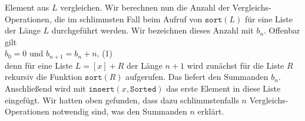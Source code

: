 Element aus $L$ vergleichen.  Wir berechnen nun die Anzahl der
Vergleichs-Operationen, die im schlimmsten Fall beim Aufruf von $\texttt{sort}(L)$ f\"ur
eine Liste der L\"ange $L$ durchgef\"uhrt werden.  Wir bezeichnen dieses Anzahl mit $b_n$.
Offenbar gilt \\[0.1cm]
\hspace*{1.3cm} $b_0 = 0$ \quad und \quad $b_{n+1} = b_n + n$, \hspace*{\fill} (1)\\[0.1cm]
denn f\"ur eine Liste $L = [x] + R$ der L\"ange $n+1$ wird zun\"achst f\"ur die Liste $R$ rekursiv
die Funktion $\mathtt{sort}(R)$ aufgerufen. Das liefert den Summanden $b_n$. Anschlie{\ss}end wird
mit $\mathtt{insert}(x, \mathtt{Sorted})$ 
das erste Element in diese Liste eingef\"ugt.  Wir hatten oben gefunden, dass dazu
schlimmstenfalls $n$
Vergleichs-Operationen notwendig sind, was den Summanden $n$ erkl\"art.

